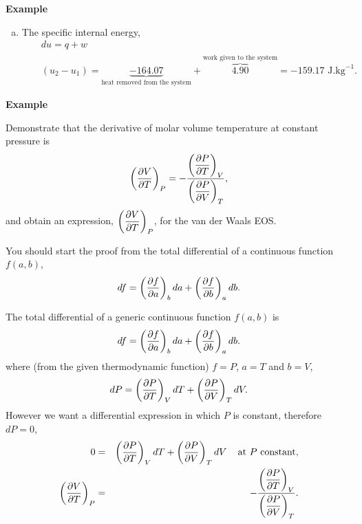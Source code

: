 \begin{MyExample}{\begin{center}{\bf Example}\end{center}}
\begin{enumerate}[a)]
%
            \item The specific internal energy,
                \begin{eqnarray}
                   &&  du = q + w \nonumber \\
                   && \left(u_{2}-u_{1}\right) = \underbrace{-164.07}_{\text{heat removed from the system}} + \overbrace{4.90}^{\text{work given to the system}} = -159.17 \text{ J.kg}^{-1}. \nonumber
                \end{eqnarray}
       \end{enumerate}
   \end{MyExample}
   

   \begin{MyExample}{\begin{center}{\bf Example}\end{center}}
     \begin{example}\label{Chapter:ThermodynamicPropertiesPureFluids:Example3}  
     Demonstrate that the derivative of molar volume \wrt temperature at constant pressure is
     \begin{displaymath}
         \Partial[V]{T}{P} = -\frc{\Partial[P]{T}{V}}{\Partial[P]{V}{T}},
     \end{displaymath}
     and obtain an expression, $\Partial[V]{T}{P}$, for the van der Waals EOS. 

      You should start the proof from the total differential of a continuous function $f(a,b)$,
     \begin{displaymath}
         df = \Partial[f]{a}{b}da + \Partial[f]{b}{a}db.
     \end{displaymath}
     \end{example}

     The total differential of a generic continuous function $f(a,b)$ is
     \begin{displaymath}
         df = \Partial[f]{a}{b}da + \Partial[f]{b}{a}db.
     \end{displaymath}
     where (from the given thermodynamic function) $f=P$, $a=T$ and $b=V$, \ie
     \begin{displaymath}
         dP = \Partial[P]{T}{V}dT + \Partial[P]{V}{T}dV.
     \end{displaymath}
     However we want a differential expression in which $P$ is constant, therefore $dP = 0$,
     \begin{eqnarray}
         0 &=& \Partial[P]{T}{V}dT + \Partial[P]{V}{T}dV \;\;\;\text{ at } P \text{ constant},\nonumber \\
         \Partial[V]{T}{P} &=& -\frc{\Partial[P]{T}{V}}{\Partial[P]{V}{T}}.\nonumber
     \end{eqnarray}


\end{MyExample}
